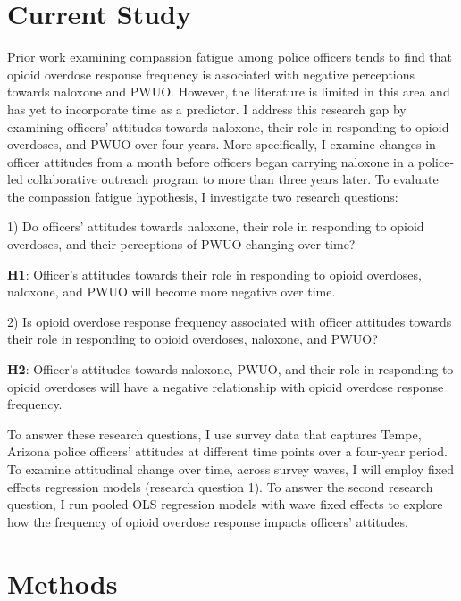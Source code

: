 \section{\centering Current Study}

Prior work examining compassion fatigue among police officers tends to find that opioid overdose response frequency is associated with negative perceptions towards naloxone and PWUO. However, the literature is limited in this area and has yet to incorporate time as a predictor. I address this research gap by examining officers’ attitudes towards naloxone, their role in responding to opioid overdoses, and PWUO over four years. More specifically, I examine changes in officer attitudes from a month before officers began carrying naloxone in a police-led collaborative outreach program to more than three years later. To evaluate the compassion fatigue hypothesis, I investigate two research questions:

1) Do officers’ attitudes towards naloxone, their role in responding to opioid overdoses, and their perceptions of PWUO changing over time? 

\begin{flushleft}
\noindent \textbf{H1}: Officer's attitudes towards their role in responding to opioid overdoses, naloxone, and PWUO will become more negative over time.
\end{flushleft}

2) Is opioid overdose response frequency associated with officer attitudes towards their role in responding to opioid overdoses, naloxone, and PWUO? 

\begin{flushleft}
\noindent \textbf{H2}: Officer's attitudes towards naloxone, PWUO, and their role in responding to opioid overdoses will have a negative relationship with opioid overdose response frequency.
\end{flushleft}

To answer these research questions, I use survey data that captures Tempe, Arizona police officers’ attitudes at different time points over a four-year period. To examine attitudinal change over time, across survey waves, I will employ fixed effects regression models (research question 1). To answer the second research question, I run pooled OLS regression models with wave fixed effects to explore how the frequency of opioid overdose response impacts officers’ attitudes.

\section{\centering Methods}
